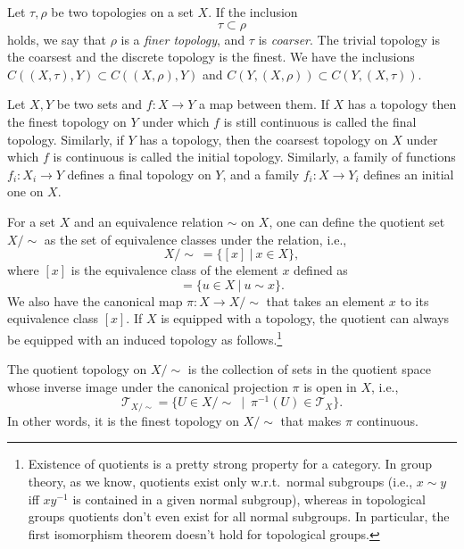 \begin{defn}
    Let $\tau,\rho$ be two topologies on a set $X$. If the inclusion
    \[\tau \subset \rho\]
    holds, we say that $\rho$ is a \emph{finer topology}, and $\tau$ is \emph{coarser}. The trivial topology is the coarsest and the discrete topology is the finest. We have the inclusions $C((X,\tau),Y)\subset C((X,\rho),Y)$ and $C(Y,(X,\rho))\subset C(Y,(X,\tau))$.
\end{defn}

\begin{defn}
    Let $X,Y$ be two sets and $f:X\to Y$ a map between them. If $X$ has a topology then the finest topology on $Y$ under which $f$ is still continuous is called the final topology. Similarly, if $Y$ has a topology, then the coarsest topology on $X$ under which $f$ is continuous is called the initial topology. Similarly, a family of functions $f_i:X_i\to Y$ defines a final topology on $Y$, and a family $f_i:X\to Y_i$ defines an initial one on $X$.
\end{defn}

For a set $X$ and an equivalence relation $\sim$ on $X$, one can define the quotient set $X/\sim$ as the set of equivalence classes under the relation, i.e.,
\begin{equation}
    X/\sim ~ = \{ [x] ~|~ x\in X \},
\end{equation}
where $[x]$ is the equivalence class of the element $x$ defined as
\begin{equation}
    [x] = \{u\in X ~|~ u \sim x\}.
\end{equation}
We also have the canonical map $\pi:X\rightarrow X/\sim$ that takes an element $x$ to its equivalence class $[x]$. If $X$ is equipped with a topology, the quotient can always be equipped with an induced topology as follows.\footnote{Existence of quotients is a pretty strong property for a category. In group theory, as we know, quotients exist only w.r.t.\ normal subgroups (i.e., $x\sim y$ iff $xy^{-1}$ is contained in a given normal subgroup), whereas in topological groups quotients don't even exist for all normal subgroups. In particular, the first isomorphism theorem doesn't hold for topological groups.}


\begin{defn}
    The quotient topology on $X/\sim$ is the collection of sets  in the quotient space whose inverse image under the canonical projection $\pi$ is open in $X$, i.e.,
    \begin{equation}
        \mathcal{T}_{X/\sim} = \{U\in X/\sim ~ \mid ~ \pi^{-1}(U) \in \mathcal{T}_X\}.
    \end{equation}
    In other words, it is the finest topology on $X/\sim$ that makes $\pi$ continuous.
\end{defn}

